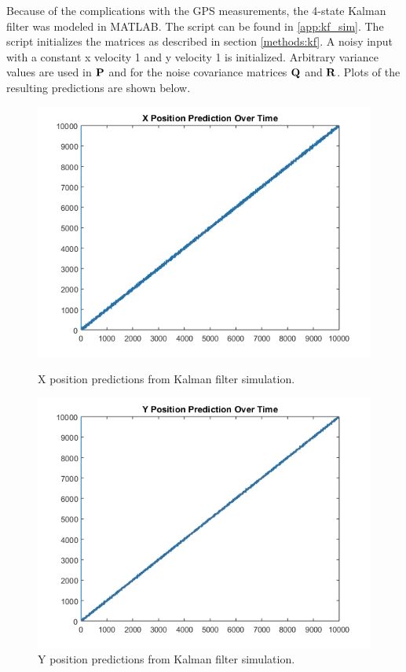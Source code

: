 Because of the complications with the GPS measurements, the 4-state Kalman filter
was modeled in MATLAB. The script can be found in \ref{app:kf_sim}. The script 
initializes the matrices as described in section \ref{methods:kf}. A noisy input
with a constant x velocity 1 and y velocity 1 is initialized. Arbitrary variance
values are used in $\mathbf{P}$ and for the noise covariance matrices $\mathbf{Q}$
and $\mathbf{R}$. Plots of the resulting predictions are shown below. 
\begin{figure}[ht!]
\begin{minipage}{.5\textwidth}
  \centering
\includegraphics[scale=0.5]{img/kf_xpos.png}
\caption{X position predictions from Kalman filter simulation.}
\label{fig:kf_xpos}
\end{minipage}
\begin{minipage}{0.5\textwidth}
\centering
\includegraphics[scale=0.5]{img/kf_ypos.png}
\caption{Y position predictions from Kalman filter simulation.}
\label{fig:kf_ypos}
\end{minipage}
\end{figure}
